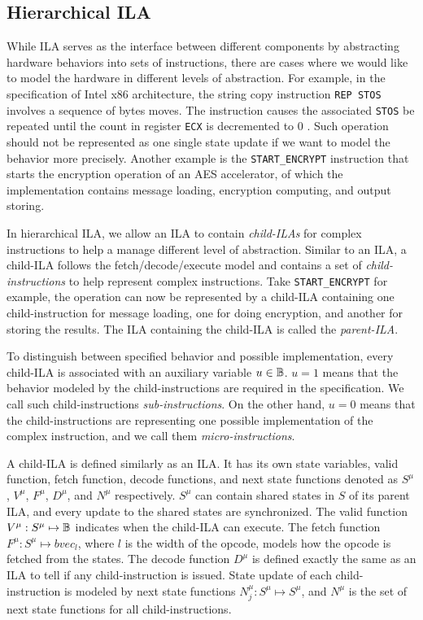 \subsection*{Hierarchical ILA}
While ILA serves as the interface between different components by 
abstracting hardware behaviors into sets of instructions, there are cases where
we would like to model the hardware in different levels of abstraction.
For example, in the specification of Intel x86 architecture, the string copy 
instruction \texttt{REP STOS} involves a sequence of bytes moves.
The instruction causes the associated \texttt{STOS} be repeated until the count
in register \texttt{ECX} is decremented to $0$ \cite{intel-manual}.
Such operation should not be represented as one single state update if we want to
model the behavior more precisely.
Another example is the \texttt{START\_ENCRYPT} instruction that starts the 
encryption operation of an AES accelerator, of which the implementation contains 
message loading, encryption computing, and output storing.

In hierarchical ILA, we allow an ILA to contain \textit{child-ILAs} for complex
instructions to help a manage different level of abstraction.
Similar to an ILA, a child-ILA follows the fetch/decode/execute model and 
contains a set of \textit{child-instructions} to help represent complex 
instructions.
Take \texttt{START\_ENCRYPT} for example, the operation can now be represented by 
a child-ILA containing one child-instruction for message loading, one for doing 
encryption, and another for storing the results.
The ILA containing the child-ILA is called the \textit{parent-ILA}.

To distinguish between specified behavior and possible implementation, every 
child-ILA is associated with an auxiliary variable $u \in \mathbb{B}$. 
$u = 1$ means that the behavior modeled by the child-instructions are required
in the specification.
We call such child-instructions \textit{sub-instructions}.
On the other hand, $u = 0$ means that the child-instructions are representing 
one possible implementation of the complex instruction, and we call them
\textit{micro-instructions}.

A child-ILA is defined similarly as an ILA.
It has its own state variables, valid function, fetch function, decode functions, 
and next state functions denoted as $S^\mu$, $V^\mu$, $F^\mu$, $D^\mu$, and 
$N^\mu$ respectively.
$S^\mu$ can contain shared states in $S$ of its parent ILA, and every update to
the shared states are synchronized.
The valid function $V^\mu : S^\mu \mapsto \mathbb{B}$ indicates when the child-ILA
can execute.
The fetch function $F^\mu : S^\mu \mapsto bvec_l$, where $l$ is the width of the
opcode, models how the opcode is fetched from the states.
The decode function $D^\mu$ is defined exactly the same as an ILA to tell if 
any child-instruction is issued.
State update of each child-instruction is modeled by next state functions
$N^\mu_j : S^\mu \mapsto S^\mu$, and $N^\mu$ is the set of next state functions 
for all child-instructions.

